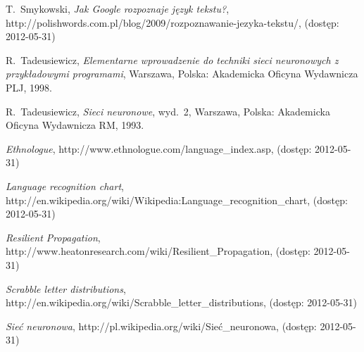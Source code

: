 \documentclass[journal]{IEEEtran}
\begin{document}
%
%
%
\begin{thebibliography}{1}

T.~Smykowski, \emph{Jak Google rozpoznaje język tekstu?},
http://polishwords.com.pl/blog/2009/rozpoznawanie-jezyka-tekstu/,
(dostęp: 2012-05-31)

R.~Tadeusiewicz, \emph{Elementarne wprowadzenie do techniki sieci neuronowych
z przykładowymi programami}, Warszawa, Polska: Akademicka Oficyna Wydawnicza PLJ, 1998.

R.~Tadeusiewicz, \emph{Sieci neuronowe}, wyd.~2, Warszawa, Polska: Akademicka
Oficyna Wydawnicza RM, 1993.

\emph{Ethnologue}, http://www.ethnologue.com/language\_index.asp,
(dostęp: 2012-05-31)

\emph{Language recognition chart}, \\ http://en.wikipedia.org/wiki/Wikipedia:Language\_recognition\_chart,
(dostęp: 2012-05-31)

\emph{Resilient Propagation}, \\ http://www.heatonresearch.com/wiki/Resilient\_Propagation,
(dostęp: 2012-05-31)

\emph{Scrabble letter distributions}, \\ http://en.wikipedia.org/wiki/Scrabble\_letter\_distributions,
(dostęp: 2012-05-31)

\emph{Sieć neuronowa}, http://pl.wikipedia.org/wiki/Sieć\_neuronowa,
(dostęp: 2012-05-31)


\end{thebibliography}
\end{document}
